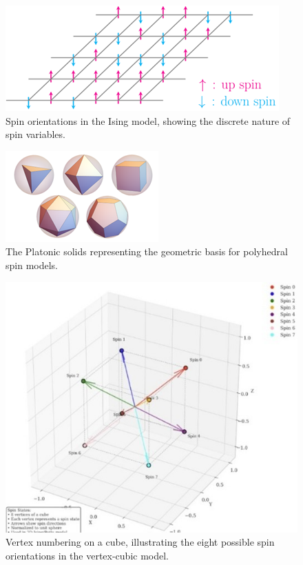\documentclass[conference, compsoc, twoside]{IEEEtran}
\begin{document}
\begin{figure}[ht]
    \centering
    \includegraphics[width=0.9\columnwidth]{Gambar 5. Spin pada Model Ising.png}
    \caption{Spin orientations in the Ising model, showing the discrete nature of spin variables.}
    \label{fig:ising_model}
\end{figure}

\begin{figure}[ht]
    \centering
    \includegraphics[width=0.9\columnwidth]{Gambar 6. The Platonic Solids.png}
    \caption{The Platonic solids representing the geometric basis for polyhedral spin models.}
    \label{fig:platonic_solids}
\end{figure}

\begin{figure}[ht]
    \centering
    \includegraphics[width=0.9\columnwidth]{Gambar 7. Penommoran Titik Sudut pada Kubus.jpg}
    \caption{Vertex numbering on a cube, illustrating the eight possible spin orientations in the vertex-cubic model.}
    \label{fig:cube_vertices}
\end{figure}
\end{document}
